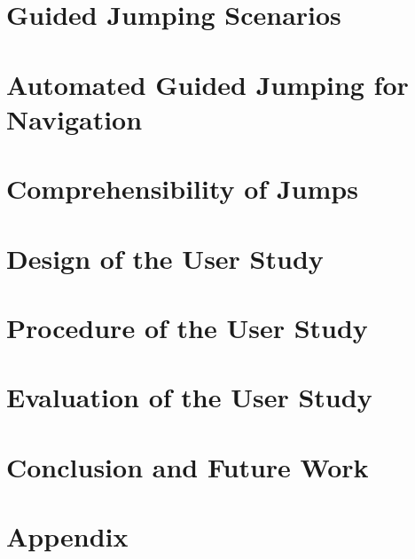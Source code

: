 
\chapter{Guided Jumping Scenarios}



\chapter{Automated Guided Jumping for Navigation}



\chapter{Comprehensibility of Jumps}



\chapter{Design of the User Study}



\chapter{Procedure of the User Study}



\chapter{Evaluation of the User Study}



\chapter{Conclusion and Future Work}



{\footnotesize
{}

}


\appendix
\chapter{Appendix}



